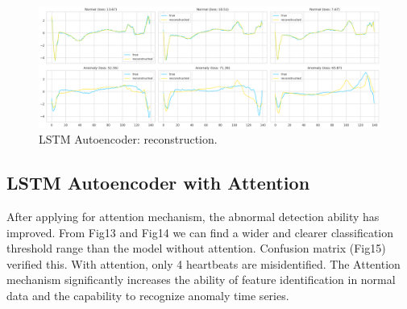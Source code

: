 \documentclass{article}
\begin{document}
\begin{figure}[!t]
    \centering
    \includegraphics[width=1.0\textwidth]{images/baseline_reconstruct_curve.png}
    \caption{LSTM Autoencoder: reconstruction.}
\end{figure}

\subsection{LSTM Autoencoder with Attention}
After applying for attention mechanism, the abnormal detection ability has improved. From Fig13 and Fig14 we can find a wider and clearer classification threshold range than the model without attention. Confusion matrix (Fig15) verified this. With attention, only 4 heartbeats are misidentified. The Attention mechanism significantly increases the ability of feature identification in normal data and the capability to recognize anomaly time series.
\end{document}
